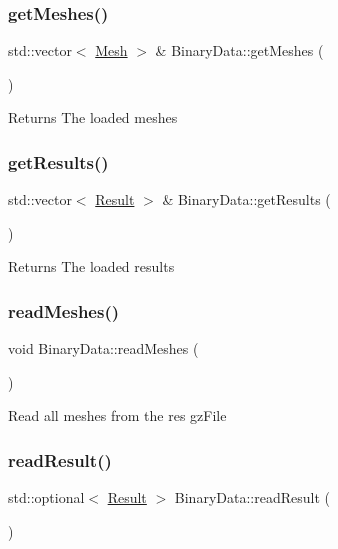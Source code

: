\subsubsection{\texorpdfstring{get\+Meshes()}{getMeshes()}}
{\footnotesize\ttfamily std\+::vector$<$ \hyperlink{classMesh}{Mesh} $>$ \& Binary\+Data\+::get\+Meshes (\begin{DoxyParamCaption}{ }\end{DoxyParamCaption})}

\begin{DoxyReturn}{Returns}
The loaded meshes 
\end{DoxyReturn}
\mbox{\label{classBinaryData_a33f15e0f1b9c34d286e84bc615e7a83e}} 
\subsubsection{\texorpdfstring{get\+Results()}{getResults()}}
{\footnotesize\ttfamily std\+::vector$<$ \hyperlink{classResult}{Result} $>$ \& Binary\+Data\+::get\+Results (\begin{DoxyParamCaption}{ }\end{DoxyParamCaption})}

\begin{DoxyReturn}{Returns}
The loaded results 
\end{DoxyReturn}
\mbox{\label{classBinaryData_a11126f35f2b4f20edc1f3c36f549fb10}} 
\subsubsection{\texorpdfstring{read\+Meshes()}{readMeshes()}}
{\footnotesize\ttfamily void Binary\+Data\+::read\+Meshes (\begin{DoxyParamCaption}{ }\end{DoxyParamCaption})}

Read all meshes from the res gz\+File \mbox{\label{classBinaryData_aa2fad71246ba4648b6f9d2045fd4201e}} 
\subsubsection{\texorpdfstring{read\+Result()}{readResult()}}
{\footnotesize\ttfamily std\+::optional$<$ \hyperlink{classResult}{Result} $>$ Binary\+Data\+::read\+Result (\begin{DoxyParamCaption}{ }\end{DoxyParamCaption})}



